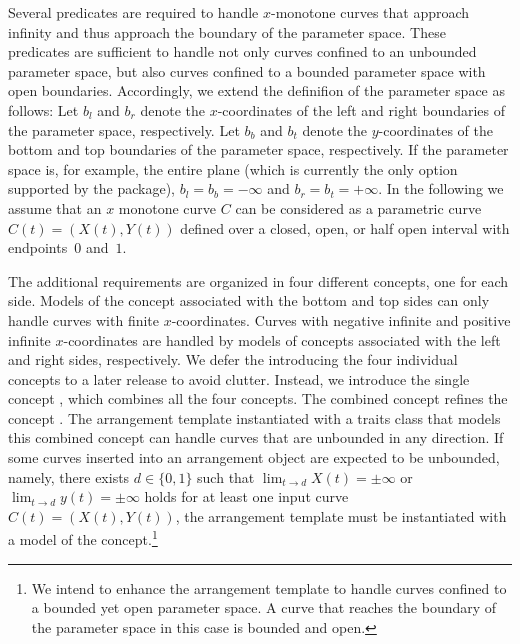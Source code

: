 Several predicates are required to handle $x$-monotone curves that
approach infinity and thus approach the boundary of the parameter
space. These predicates are sufficient to handle not only curves
confined to an unbounded parameter space, but also curves confined
to a bounded parameter space with open boundaries. Accordingly, we
extend the definifion of the parameter space as follows:
Let $b_l$ and $b_r$ denote the $x$-coordinates of the left and right
boundaries of the parameter space, respectively. Let $b_b$ and $b_t$
denote the $y$-coordinates of the bottom and top boundaries of the
parameter space, respectively. If the parameter space is, for example,
the entire plane (which is currently the only option supported by the
package), $b_l = b_b = -\infty$ and $b_r = b_t = +\infty$.
In the following we assume that an $x$ monotone curve $C$ can be
considered as a parametric curve $C(t) = (X(t),Y(t))$ defined over a
closed, open, or half open interval with endpoints~$0$ and~$1$. 

The additional requirements are organized in four different concepts,
one for each side. Models of the concept associated with the bottom
and top sides can only handle curves with finite $x$-coordinates.
Curves with negative infinite and positive infinite $x$-coordinates
are handled by models of concepts associated with the left and right
sides, respectively. We defer the introducing the four individual
concepts to a later release to avoid clutter. Instead, we introduce
the single concept , which
combines all the four concepts. The combined concept refines the
concept . The arrangement template
instantiated with a traits class that models this combined concept
can handle curves that are unbounded in any direction. If some
curves inserted into an arrangement object are expected to be
unbounded, namely, there exists $d \in \{0,1\}$ such that
$\lim_{t \rightarrow d}X(t) = \pm\infty$ or
$\lim_{t \rightarrow d}y(t) = \pm\infty$
holds for at least one input curve $C(t) = (X(t),Y(t))$, the arrangement
template must be instantiated with a model of the
 concept.\footnote{We
  intend to enhance the arrangement template to handle curves confined
  to a bounded yet open parameter space. A curve that reaches the
  boundary of the parameter space in this case is bounded and open.}

